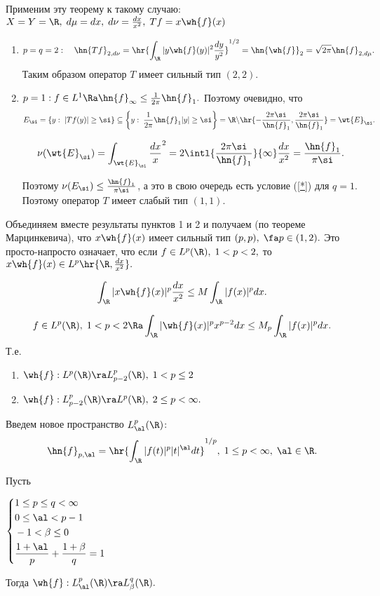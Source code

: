 \documentclass[a4paper]{article}
\begin{document}
Применим эту теорему к такому случаю: $X=Y=\R ,\;d\mu=dx,\;d\nu=\frac{dx}{x^2},\;Tf=x\wh{f}(x)$
\begin{enumerate}
\item
$$p=q=2:\quad\hn{Tf}_{2,d\nu}=\hr{\int_{\R }|y\wh{f}(y)|^2\frac{dy}{y^2}}^{1/2}=\hn{\wh{f}}_2=\sqrt{2\pi}\hn{f}_{2,d\mu}.$$
Таким образом оператор $T$ имеет сильный тип $(2,2).$
\item
$p=1: f\in L^1\Ra\hn{f}_{\infty}\le\frac1{2\pi}\hn{f}_1.$ Поэтому очевидно, что
$$E_{\si}=\{y:\;|Tf(y)|\ge\si\}\subseteq\left\{y:\;\frac1{2\pi}\hn{f}_1|y|\ge\si\right\}=\R \backslash\hr{-\frac{2\pi\si}{\hn{f}_1},\frac{2\pi\si}{\hn{f}_1}}=\wt{E}_{\si}.$$

$$\nu(\wt{E}_{\si})=\int_{\wt{E}_{\si}}\frac{dx}x^2=2\intl{\frac{2\pi\si}{\hn{f}_1}}{\infty}\frac{dx}{x^2}=\frac{\hn{f}_1}{\pi\si}.$$

Поэтому $\nu(E_{\si})\le\frac{\hn{f}_1}{\pi\si}$, а это в свою очередь есть условие (\ref{*}) для
$q=1.$ Поэтому оператор $T$ имеет слабый тип $(1,1).$
\end{enumerate}
Объединяем вместе результаты пунктов 1 и 2 и получаем (по теореме Марцинкевича), что $x\wh{f}(x)$ имеет
сильный тип $(p,p),\;\fa p\in(1,2).$ Это просто-напросто означает, что если $f\in
L^p(\R ),\;1<p<2,$ то $x\wh{f}(x)\in L^p\hr{\R ,\frac{dx}{x^2}}.$

$$\int_{\R }|x\wh{f}(x)|^p\frac{dx}{x^2}\le M\int_{\R }|f(x)|^p
dx.$$

\begin{theorems}
$$f\in L^p(\R ),\;1<p<2\Ra
\int_{\R }|\wh{f}(x)|^px^{p-2}dx\le M_p\int_{\R }|f(x)|^pdx.$$ Т.е.
\begin{enumerate}
\item
$\wh{f}:L^p(\R )\ra L^p_{p-2}(\R ),\;1<p\le2$
\item
$\wh{f}:L^p_{p-2}(\R )\ra L^p(\R ),\;2\le p<\infty.$
\end{enumerate}
\end{theorems}

Введем новое пространство $L^p_{\al}(\R )$:
$$\hn{f}_{p,\al}=\hr{\int_{\R }|f(t)|^p|t|^{\al}dt}^{1/p},\;1\le p<\infty,\;\al\in \R .$$
\begin{theorems}[Питт]
Пусть

\begin{center}$\left\{\begin{aligned}
&1\le p\le q<\infty\\
&0\le\al<p-1\\
&-1<\beta\le0\\
&\frac{1+\al}p+\frac{1+\beta}q=1
\end{aligned}\right.$
\end{center}
Тогда $\wh{f}:L^p_{\al}(\R )\ra L^q_{\beta}(\R ).$
\end{theorems}
\end{document}

